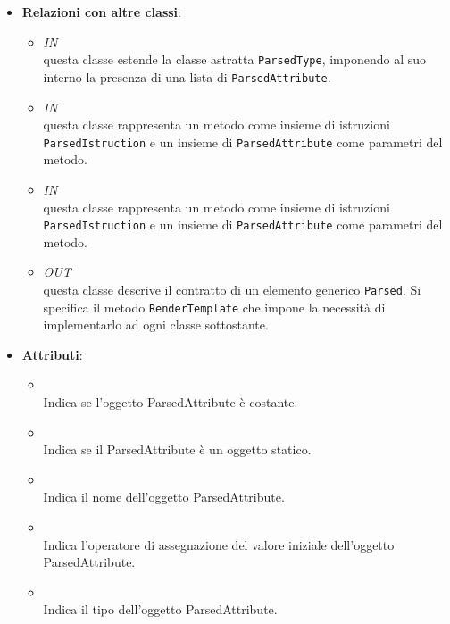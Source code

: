 \begin{itemize}
\item \textbf{Relazioni con altre classi}:
\begin{itemize}
\item \textit{IN} \hyperref[\nogloxy{swedesigner::server::project::ParsedClass}]{}\\
questa classe estende la classe astratta \texttt{ParsedType}, imponendo al suo interno la presenza di una lista di \texttt{ParsedAttribute}. 
\item \textit{IN} \hyperref[\nogloxy{swedesigner::server::project::ParsedMethod}]{}\\
questa classe rappresenta un metodo come insieme di istruzioni \texttt{ParsedIstruction} e un insieme di \texttt{ParsedAttribute} come parametri del metodo.
\item \textit{IN} \hyperref[\nogloxy{swedesigner::server::project::ParsedMethod}]{}\\
questa classe rappresenta un metodo come insieme di istruzioni \texttt{ParsedIstruction} e un insieme di \texttt{ParsedAttribute} come parametri del metodo.
\item \textit{OUT} \hyperref[\nogloxy{swedesigner::server::project::ParsedElement}]{}\\
questa classe descrive il contratto di un elemento generico \texttt{Parsed}. Si specifica il metodo \texttt{RenderTemplate} che impone la necessità di implementarlo ad ogni classe sottostante.
\end{itemize}
\item \textbf{Attributi}:
\begin{itemize}
\item {}
\\ Indica se l'oggetto ParsedAttribute è costante.
\item {}
\\ Indica se il ParsedAttribute è un oggetto statico.
\item {}
\\ Indica il nome dell'oggetto ParsedAttribute.
\item {}
\\ Indica l'operatore di assegnazione del valore iniziale dell'oggetto ParsedAttribute.
\item {}
\\ Indica il tipo dell'oggetto ParsedAttribute.

\end{itemize}
\end{itemize}
